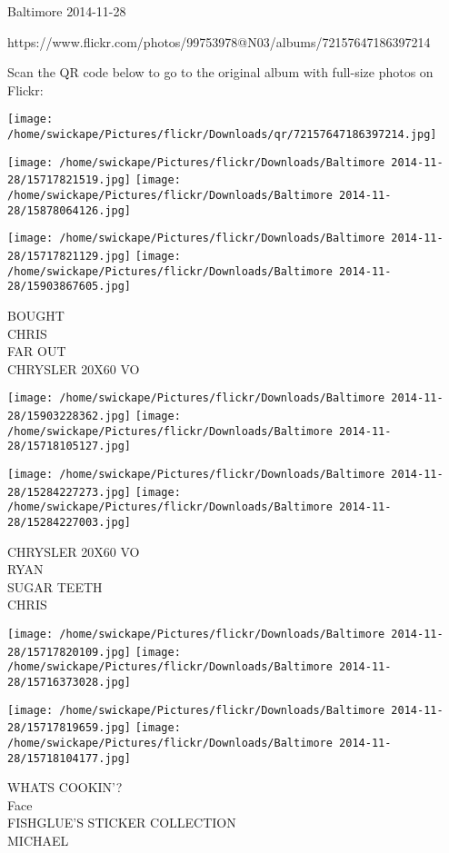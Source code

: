 \documentclass[10pt,letterpaper]{article}
\begin{document}
Baltimore 2014-11-28

https://www.flickr.com/photos/99753978@N03/albums/72157647186397214

Scan the QR code below to go to the original album with full-size photos on Flickr:

\texttt{[image: /home/swickape/Pictures/flickr/Downloads/qr/72157647186397214.jpg]}
\pagebreak

\texttt{[image: /home/swickape/Pictures/flickr/Downloads/Baltimore 2014-11-28/15717821519.jpg]}
\texttt{[image: /home/swickape/Pictures/flickr/Downloads/Baltimore 2014-11-28/15878064126.jpg]}

\texttt{[image: /home/swickape/Pictures/flickr/Downloads/Baltimore 2014-11-28/15717821129.jpg]}
\texttt{[image: /home/swickape/Pictures/flickr/Downloads/Baltimore 2014-11-28/15903867605.jpg]}

BOUGHT\\
CHRIS\\
FAR OUT\\
CHRYSLER 20X60 VO\\
\pagebreak

\texttt{[image: /home/swickape/Pictures/flickr/Downloads/Baltimore 2014-11-28/15903228362.jpg]}
\texttt{[image: /home/swickape/Pictures/flickr/Downloads/Baltimore 2014-11-28/15718105127.jpg]}

\texttt{[image: /home/swickape/Pictures/flickr/Downloads/Baltimore 2014-11-28/15284227273.jpg]}
\texttt{[image: /home/swickape/Pictures/flickr/Downloads/Baltimore 2014-11-28/15284227003.jpg]}

CHRYSLER 20X60 VO\\
RYAN\\
SUGAR TEETH\\
CHRIS\\
\pagebreak

\texttt{[image: /home/swickape/Pictures/flickr/Downloads/Baltimore 2014-11-28/15717820109.jpg]}
\texttt{[image: /home/swickape/Pictures/flickr/Downloads/Baltimore 2014-11-28/15716373028.jpg]}

\texttt{[image: /home/swickape/Pictures/flickr/Downloads/Baltimore 2014-11-28/15717819659.jpg]}
\texttt{[image: /home/swickape/Pictures/flickr/Downloads/Baltimore 2014-11-28/15718104177.jpg]}

WHATS COOKIN'?\\
Face\\
FISHGLUE'S STICKER COLLECTION\\
MICHAEL\\
\pagebreak
\end{document}
